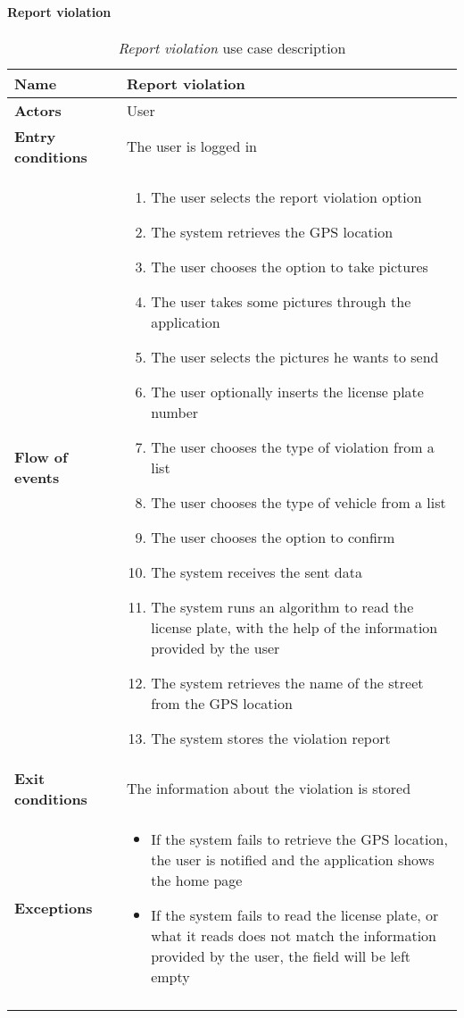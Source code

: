 		\paragraph{Report violation}
		\begin{longtable}{p{0.25\linewidth}p{0.75\linewidth}}
			\toprule
			\textbf{Name} & \textbf{Report violation} \\
			\midrule
			\textbf{Actors} & User \\
			\midrule
			\textbf{Entry conditions} & The user is logged in \\
			\midrule
			\textbf{Flow of events} & 
			\begin{enumerate}
				\item The user selects the report violation option
				\item The system retrieves the GPS location
				\item The user chooses the option to take pictures
				\item The user takes some pictures through the application
				\item The user selects the pictures he wants to send
				\item The user optionally inserts the license plate number
				\item The user chooses the type of violation from a list
				\item The user chooses the type of vehicle from a list
				\item The user chooses the option to confirm
				\item The system receives the sent data
				\item The system runs an algorithm to read the license plate, with the help of the information provided by the user
				\item The system retrieves the name of the street from the GPS location
				\item The system stores the violation report
			\end{enumerate} \\
			\midrule
			\textbf{Exit conditions} & The information about the violation is stored\\
			\midrule
			\textbf{Exceptions} & 
			\begin{itemize}
				\item If the system fails to retrieve the GPS location, the user is notified and the application shows the home page
				\item If the system fails to read the license plate, or what it reads does not match the information provided by the user, the field will be left empty
			\end{itemize} \\
			\bottomrule
			\caption{\emph{Report violation} use case description}
		\end{longtable}

